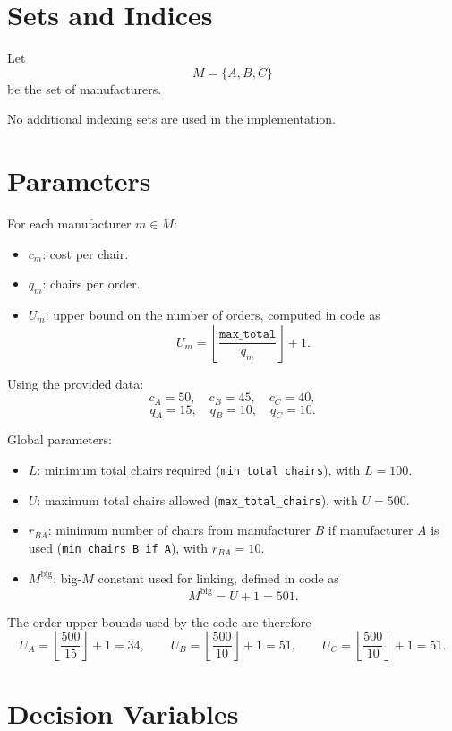 \section*{Sets and Indices}

Let
\[
M = \{A,B,C\}
\]
be the set of manufacturers.

No additional indexing sets are used in the implementation.

\section*{Parameters}

For each manufacturer \(m \in M\):
\begin{itemize}
    \item \(c_m\): cost per chair.
    \item \(q_m\): chairs per order.
    \item \(U_m\): upper bound on the number of orders, computed in code as
    \[
    U_m = \left\lfloor \frac{\texttt{max\_total}}{q_m} \right\rfloor + 1.
    \]
\end{itemize}

Using the provided data:
\[
c_A = 50,\quad c_B = 45,\quad c_C = 40,
\]
\[
q_A = 15,\quad q_B = 10,\quad q_C = 10.
\]

Global parameters:
\begin{itemize}
    \item \(L\): minimum total chairs required (\texttt{min\_total\_chairs}), with \(L=100\).
    \item \(U\): maximum total chairs allowed (\texttt{max\_total\_chairs}), with \(U=500\).
    \item \(r_{BA}\): minimum number of chairs from manufacturer \(B\) if manufacturer \(A\) is used (\texttt{min\_chairs\_B\_if\_A}), with \(r_{BA}=10\).
    \item \(M^{\text{big}}\): big-\(M\) constant used for linking, defined in code as
    \[
    M^{\text{big}} = U + 1 = 501.
    \]
\end{itemize}

The order upper bounds used by the code are therefore
\[
U_A = \left\lfloor \frac{500}{15} \right\rfloor + 1 = 34,\qquad
U_B = \left\lfloor \frac{500}{10} \right\rfloor + 1 = 51,\qquad
U_C = \left\lfloor \frac{500}{10} \right\rfloor + 1 = 51.
\]

\section*{Decision Variables}

